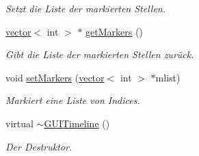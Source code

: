 \begin{DoxyCompactItemize}
\begin{DoxyCompactList}\small\item\em Setzt die Liste der markierten Stellen. \end{DoxyCompactList}\item 
\hyperlink{classstd_1_1vector}{vector}$<$ int $>$ $\ast$ \hyperlink{classGUITimeline_a0475107a9485faf7b9bf8836de3d8016}{get\-Markers} ()
\begin{DoxyCompactList}\small\item\em Gibt die Liste der markierten Stellen zurück. \end{DoxyCompactList}\item 
void \hyperlink{classGUITimeline_a48087c3b671d161fe04585f478dabd99}{set\-Markers} (\hyperlink{classstd_1_1vector}{vector}$<$ int $>$ $\ast$mlist)
\begin{DoxyCompactList}\small\item\em Markiert eine Liste von Indices. \end{DoxyCompactList}\item 
virtual \hyperlink{classGUITimeline_aa912aa353abcfc4127c05269141adf83}{$\sim$\-G\-U\-I\-Timeline} ()
\begin{DoxyCompactList}\small\item\em Der Destruktor. \end{DoxyCompactList}\end{DoxyCompactItemize}
